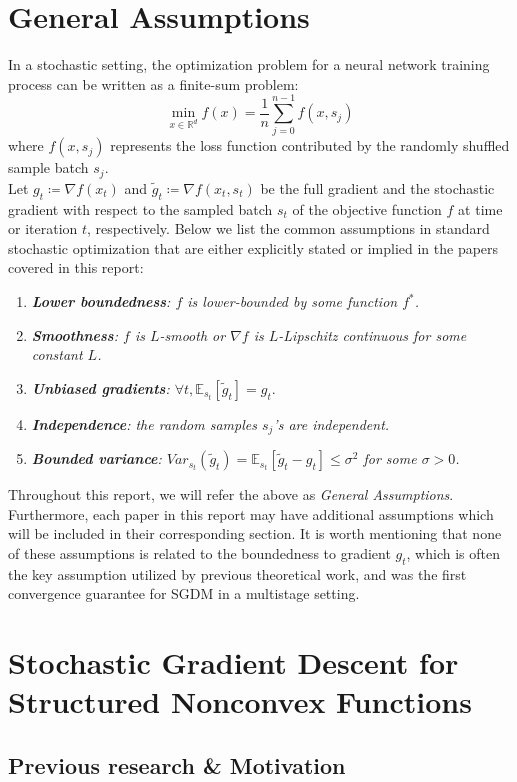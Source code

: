 \documentclass{article}
\begin{document}
\section{General Assumptions}
In a stochastic setting, the optimization problem for a neural network training process can be written as a finite-sum problem:
\[
\min_{x \in \mathbb{R}^d} f(x) = \frac{1}{n}\sum_{j = 0}^{n - 1} f(x, s_j)
\]
where $f(x, s_j)$ represents the loss function contributed by the randomly shuffled sample batch $s_j$.\\
\newline
Let $g_t\coloneqq\nabla f(x_t)$ and $\tilde{g}_t \coloneqq  \nabla f(x_t, s_t)$ be the full gradient and the stochastic gradient with respect to the sampled batch $s_t$ of the objective function $f$ at time or iteration $t$, respectively. Below we list the common assumptions in standard stochastic optimization that are either explicitly stated or implied in the papers covered in this report:
\begin{enumerate}[leftmargin=*]
	\item \textit{\textbf{Lower boundedness}: $f$ is lower-bounded by some function $f^*$.}
	\item \textit{\textbf{Smoothness}: $f$ is $L$-smooth or $\nabla f$ is $L$-Lipschitz continuous for some constant $L$.}
	\item \textit{\textbf{Unbiased gradients}: $\forall t, \mathbb{E}_{s_t}[\tilde{g}_t] = g_t$}.
	\item \textit{\textbf{Independence}: the random samples $s_j$'s are independent.}
	\item \textit{\textbf{Bounded variance}: $Var_{s_t}(\tilde{g}_t) = \mathbb{E}_{s_t}[\tilde{g}_t - g_t] \leq \sigma^2$ for some $\sigma > 0$.}
\end{enumerate}
Throughout this report, we will refer the above as \textit{General Assumptions}. Furthermore, each paper in this report may have additional assumptions which will be included in their corresponding section. It is worth mentioning that none of these assumptions is related to the boundedness to gradient $g_t$, which is often the key assumption utilized by previous theoretical work, and was the first convergence guarantee for SGDM in a multistage setting.
\section{Stochastic Gradient Descent for Structured Nonconvex Functions}
\label{section3}
\subsection{Previous research \& Motivation}
\end{document}
